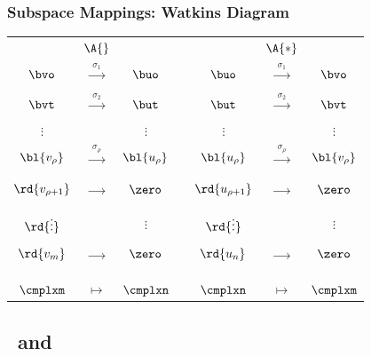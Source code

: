 \begin{frame}
	\frametitle{\bf{Subspace Mappings: Watkins Diagram}}
{\small{
\begin{table}[htbp]
	\begin{center}
		\begin{tabular}{ccccccc}
		  & $\A{}$ &&&& $\A{*}$ \\
		  $\bvo$ & $\xrightarrow[]{ \phantom{1} \sigma_{1} \phantom{1} }$ & $\buo$ & &
		  $\buo$ & $\xrightarrow[]{ \phantom{1} \sigma_{1} \phantom{1} }$ & $\bvo$ \\
		  $\bvt$ & $\xrightarrow[]{ \phantom{1} \sigma_{2} \phantom{1} }$ & $\but$ & &
		  $\but$ & $\xrightarrow[]{ \phantom{1} \sigma_{2} \phantom{1} }$ & $\bvt$ \\
		  $\vdots$ & & $\vdots$ & & $\vdots$ &  & $\vdots$ \\
		  ${\bl{ v_{\rho} }}$ & $\xrightarrow[]{ \phantom{1} \sigma_{\rho} \phantom{1} }$ & ${\bl{ u_{\rho} }}$ & &
		  ${\bl{ u_{\rho} }}$ & $\xrightarrow[]{ \phantom{1} \sigma_{\rho} \phantom{1} }$ & ${\bl{ v_{\rho} }}$ \\[5pt]
		  ${\rd{ v_{\rho+1} }}$ & $\xrightarrow[]{ \phantom{1} \phantom{\sigma_{\rho}} \phantom{1} }$ & $\zero$ & & 
		  ${\rd{ u_{\rho+1} }}$ & $\xrightarrow[]{ \phantom{1} \phantom{\sigma_{\rho}} \phantom{1} }$ & $\zero$ \\ \\
		  ${\rd {\vdots }}$ & & $\vdots$ & & ${\rd {\vdots }}$ &  & $\vdots$ \\
		  ${\rd{ v_{m} }}$ & $\xrightarrow[]{ \phantom{1} \phantom{\sigma_{\rho}} \phantom{1} }$ & $\zero$ & & 
		  ${\rd{ u_{n} }}$ & $\xrightarrow[]{ \phantom{1} \phantom{\sigma_{\rho}} \phantom{1} }$ & $\zero$ \\ \\\hline \\
		  $\cmplxm$ & $\mapsto$ & $\cmplxn$ && $\cmplxn$ & $\mapsto$ & $\cmplxm$
		\end{tabular}
	\end{center}
	\label{tab:watkins diagram}
\end{table}
}}
\end{frame}

\subsection{\bsvd \ and \ls}

